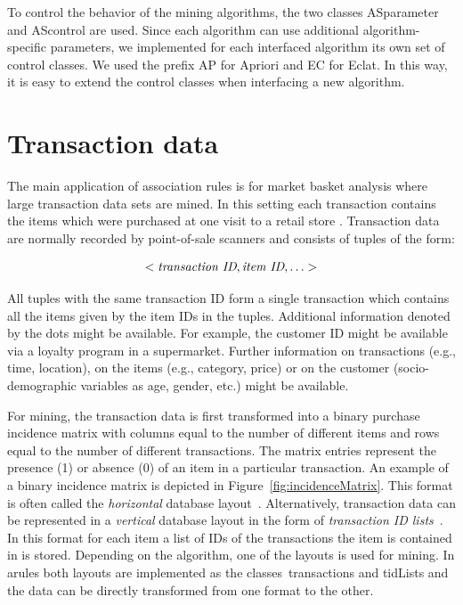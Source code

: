 \documentclass[10pt,a4paper]{article}
\newcommand{\strong}[1]{{\normalfont\fontseries{b}\selectfont #1}}
\newcommand{\class}[1]{\textsf{#1}}
\newcommand{\pkg}[1]{\strong{#1}}
\begin{document}
To control the behavior of the mining algorithms, the two classes
\class{ASparameter} and \class{AScontrol} are used.  Since each
algorithm can use additional algorithm-specific parameters, we
implemented for each interfaced algorithm its own set of control
classes.  We used the prefix \class{AP} for Apriori and \class{EC} for
Eclat.  In this way, it is easy to extend the control classes when
interfacing a new algorithm.


\section{Transaction data\label{sec:transactions}}

The main application of association rules is for market basket analysis
where large transaction data sets are mined.  In this setting each
transaction contains the items which were purchased at one visit to a
retail store \citep[see e.g.,][]{arules:Berry+Linoff:1997}.
Transaction data are normally recorded by point-of-sale
scanners and consists of tuples of the form:

\begin{displaymath}
<\emph{transaction ID}, \emph{item ID}, \ldots >
\end{displaymath}

All tuples with the same transaction ID form a single transaction which
contains all the items given by the item IDs in the tuples.  Additional
information denoted by the dots might be available.  For example, the
customer ID might be available via a loyalty program in a supermarket.
Further information on transactions (e.g., time, location), on the items
(e.g., category, price) or on the customer (socio-demographic variables
as age, gender, etc.)  might be available.

For mining, the transaction data is first transformed into a binary
purchase incidence matrix with columns equal to the number of different
items and rows equal to the number of different transactions.  The
matrix entries represent the presence (1) or absence (0) of an item in a
particular transaction.  An example of a binary incidence matrix is
depicted in Figure~\ref{fig:incidenceMatrix}.
This format is often called the \emph{horizontal} database 
layout~\citep{arules:Zaki:2000}.
Alternatively, transaction data can be represented in a
\emph{vertical} database
layout in the form of \emph{transaction ID lists}~\citep{arules:Zaki:2000}.
In this format for each item a list of IDs of the
transactions the item is contained in is stored.
Depending on the algorithm, one of the layouts is used for mining.
In \pkg{arules} both layouts are implemented as the
classes~\class{transactions} and \class{tidLists} and the data can be
directly transformed from one format to the other.
\end{document}
